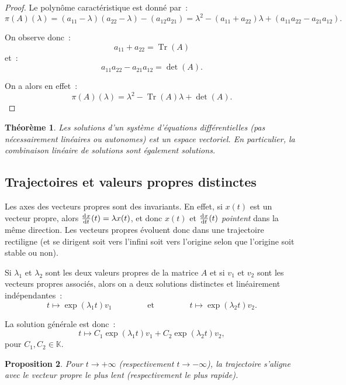 \documentclass{article}
\newtheorem{thm}{Théorème}[section]
\newtheorem{prp}[thm]{Proposition}
\theoremstyle{definition}
\theoremstyle{remark}
\DeclareMathOperator{\Tr}{Tr}
\newcommand{\K}{\mathbb K}
\begin{document}
	\begin{proof} Le polynôme caractéristique est donné par~:
	\[\pi(A)(\lambda) = (a_{11}-\lambda)(a_{22}-\lambda) - (a_{12}a_{21}) = \lambda^2 - (a_{11} + a_{22})\lambda + (a_{11}a_{22} - a_{21}a_{12}).\]

	On observe donc~:
	\[a_{11} + a_{22} = \Tr(A)\]
	et~:
	\[a_{11}a_{22} - a_{21}a_{12} = \det(A).\]

	On a alors en effet~:
	\[\pi(A)(\lambda) = \lambda^2 - \Tr(A)\lambda + \det(A).\]
	\end{proof}

	\begin{thm} Les solutions d'un système d'équations différentielles (pas nécessairement linéaires ou autonomes) est un espace vectoriel. En particulier,
	la combinaison linéaire de solutions sont également solutions.
	\end{thm}

	\subsection{Trajectoires et valeurs propres distinctes}

	Les axes des vecteurs propres sont des invariants. En effet, si $x(t)$ est un vecteur propre, alors $\od xt(t) = \lambda x(t)$, et donc $x(t)$
	et $\od xt(t)$ \textit{pointent} dans la même direction. Les vecteurs propres évoluent donc dans une trajectoire rectiligne (et se dirigent soit vers l'infini
	soit vers l'origine selon que l'origine soit stable ou non).

	Si $\lambda_1$ et $\lambda_2$ sont les deux valeurs propres de la matrice $A$ et si $v_1$ et $v_2$ sont les vecteurs propres associés, alors on
	a deux solutions distinctes et linéairement indépendantes~:
	\[t \mapsto \exp(\lambda_1t)v_1 \qquad\qquad \text{ et } \qquad\qquad t \mapsto \exp(\lambda_2t)v_2.\]

	La solution générale est donc~:
	\[t \mapsto C_1\exp(\lambda_1t)v_1 + C_2\exp(\lambda_2t)v_2,\]
	pour $C_1, C_2 \in \K$.

	\begin{prp} Pour $t \to +\infty$ (respectivement $t \to -\infty$), la trajectoire s'aligne avec le vecteur propre le plus lent (respectivement le plus rapide).
	\end{prp}
\end{document}
